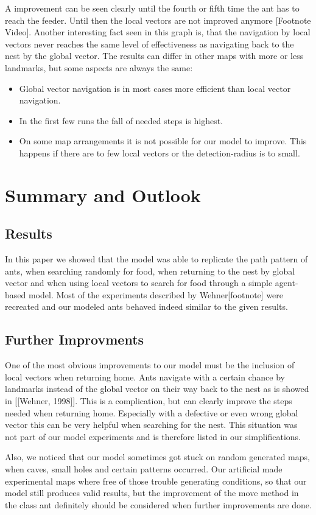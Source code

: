 \documentclass[11pt]{article}
\begin{document}
A improvement can be seen clearly until the fourth or fifth time the ant has to reach the feeder. Until then the local vectors are not improved anymore [Footnote Video]. Another interesting fact seen in this graph is, that the navigation by local vectors never reaches the same level of effectiveness as navigating back to the nest by the global vector. The results can differ in other maps with more or less landmarks, but some aspects are always the same:
\begin{itemize}
\item Global vector navigation is in most cases more efficient than local vector navigation.
\item In the first few runs the fall of needed steps is highest.
\item On some map arrangements it is not possible for our model to improve. This happens if there are to few local vectors or the detection-radius is to small.
\end{itemize}

\newpage
\section{Summary and Outlook}
\subsection{Results}
In this paper we showed that the model was able to replicate the path pattern of ants, when searching randomly for food, when returning to the nest by global vector and when using local vectors to search for food through a simple agent-based model. Most of the experiments described by Wehner[footnote] were recreated and our modeled ants behaved indeed similar to the given results.
\subsection{Further Improvments}
One of the most obvious improvements to our model must be the inclusion of local vectors when returning home. Ants navigate with a certain chance by landmarks instead of the global vector on their way back to the nest as is showed in [[Wehner, 1998]]. This is a complication, but can clearly improve the steps needed when returning home. Especially with a defective or even wrong global vector this can be very helpful when searching for the nest. This situation was not part of our model experiments and is therefore listed in our simplifications.

Also, we noticed that our model sometimes got stuck on random generated maps, when caves, small holes and certain patterns occurred. Our artificial made experimental maps where free of those trouble generating conditions, so that our model still produces valid results, but the improvement of the move method in the class ant definitely should be considered when further improvements are done.
\end{document}
